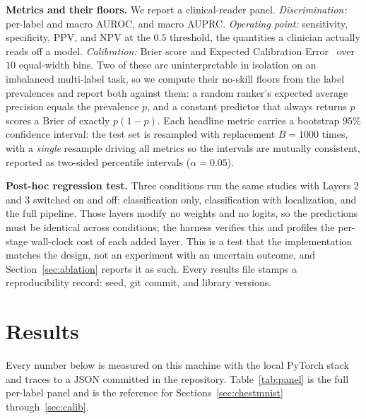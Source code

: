 \documentclass[conference]{IEEEtran}
\newcommand{\rih}[1]{\textbf{#1}\enspace\ignorespaces}
\begin{document}
\rih{Metrics and their floors.} We report a clinical-reader panel.
\emph{Discrimination:} per-label and macro AUROC, and macro AUPRC.
\emph{Operating point:} sensitivity, specificity, PPV, and NPV at the $0.5$
threshold, the quantities a clinician actually reads off a model.
\emph{Calibration:} Brier score and Expected Calibration
Error~\cite{guo2017calibration} over $10$ equal-width bins. Two of these are
uninterpretable in isolation on an imbalanced multi-label task, so we compute their
no-skill floors from the label prevalences and report both against them: a random
ranker's expected average precision equals the prevalence $p$, and a constant
predictor that always returns $p$ scores a Brier of exactly $p(1-p)$. Each headline
metric carries a bootstrap $95\%$ confidence interval: the test set is resampled
with replacement $B{=}1000$ times, with a \emph{single} resample driving all
metrics so the intervals are mutually consistent, reported as two-sided percentile
intervals ($\alpha{=}0.05$).

\rih{Post-hoc regression test.} Three conditions run the same studies with Layers 2
and 3 switched on and off: classification only, classification with localization,
and the full pipeline. Those layers modify no weights and no logits, so the
predictions must be identical across conditions; the harness verifies this and
profiles the per-stage wall-clock cost of each added layer. This is a test that the
implementation matches the design, not an experiment with an uncertain outcome, and
Section~\ref{sec:ablation} reports it as such. Every results file stamps a
reproducibility record: seed, git commit, and library versions.

\section{Results}
\label{sec:results}

Every number below is measured on this machine with the local PyTorch stack and
traces to a JSON committed in the repository. Table~\ref{tab:panel} is the full
per-label panel and is the reference for Sections~\ref{sec:chestmnist}
through~\ref{sec:calib}.
\end{document}
